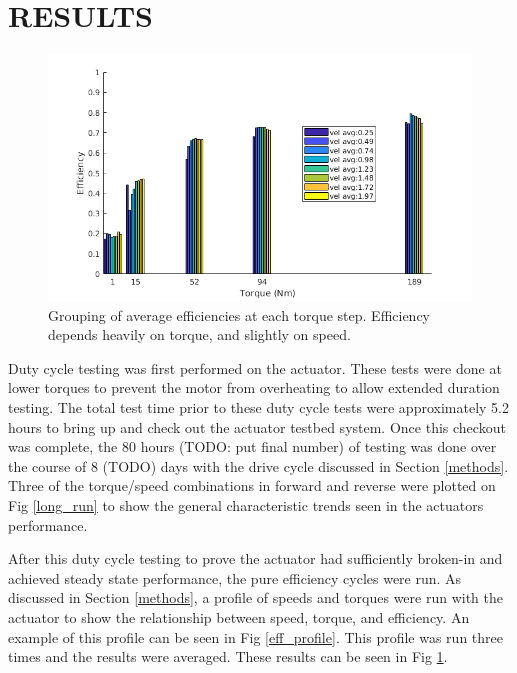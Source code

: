 \documentclass[letterpaper, 10 pt, conference]{ieeeconf}  %
\begin{document}
   
\section{RESULTS} \label{results}

   \begin{figure}[t]
      \centering
      \includegraphics[width=\linewidth]{eff_test_bar_plot_v2}
      \caption{Grouping of average efficiencies at each torque step. Efficiency depends heavily on torque, and slightly on speed.}
      \label{eff_results}
   \end{figure}

Duty cycle testing was first performed on the actuator. These tests were done at lower torques to prevent the motor from overheating to allow extended duration testing. The total test time prior to these duty cycle tests were approximately 5.2 hours to bring up and check out the actuator testbed system. Once this checkout was complete, the 80 hours (TODO: put final number) of testing was done over the course of 8 (TODO) days with the drive cycle discussed in Section \ref{methods}. Three of the torque/speed combinations in forward and reverse were plotted on Fig \ref{long_run} to show the general characteristic trends seen in the actuators performance. 
   
After this duty cycle testing to prove the actuator had sufficiently broken-in and achieved steady state performance, the pure efficiency cycles were run. As discussed in Section \ref{methods}, a profile of speeds and torques were run with the actuator to show the relationship between speed, torque, and efficiency. An example of this profile can be seen in Fig \ref{eff_profile}. This profile was run three times and the results were averaged. These results can be seen in Fig \ref{eff_results}. 
\end{document}
